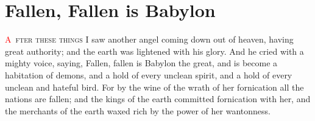 
\chapter{Fallen, Fallen is Babylon}
\lettrine[lines=3,slope=-0.5em]{\textcolor{red}{A}}{\ fter these things} I saw another angel coming down out of heaven, having great authority; and the earth was lightened with his glory. 
 And he cried with a mighty voice, saying, Fallen, fallen is Babylon the great, and is become a habitation of demons, and a hold of every unclean spirit, and a hold of every unclean and hateful bird. 
 For by the wine of the wrath of her fornication all the nations are fallen; and the kings of the earth committed fornication with her, and the merchants of the earth waxed rich by the power of her wantonness.

